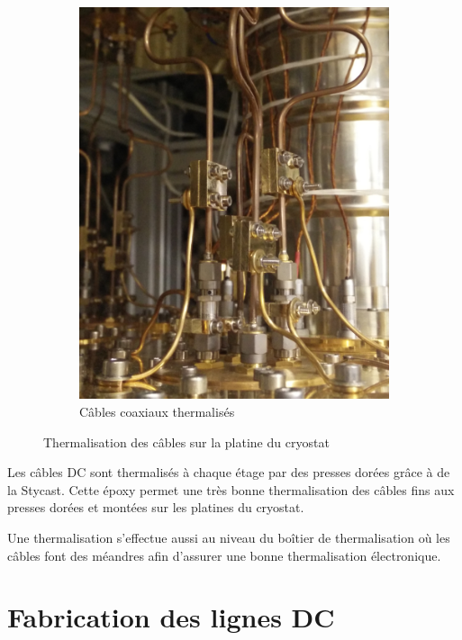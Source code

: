 \begin{figure}[h]
\begin{subfigure}[t]{0.48\textwidth}
        \includegraphics[height=1.2\textwidth]{Images/Thermalisation/Coax}
        \caption{Câbles coaxiaux thermalisés}
    \end{subfigure}
    \caption{Thermalisation des câbles sur la platine du cryostat}
\end{figure}

Les câbles DC sont thermalisés à chaque étage par des presses dorées grâce à de la Stycast. Cette époxy permet une très bonne thermalisation des câbles fins aux presses dorées et montées sur les platines du cryostat.

Une thermalisation s'effectue aussi au niveau du boîtier de thermalisation où les câbles font des méandres afin d'assurer une bonne thermalisation électronique.


\section{Fabrication des lignes DC}

